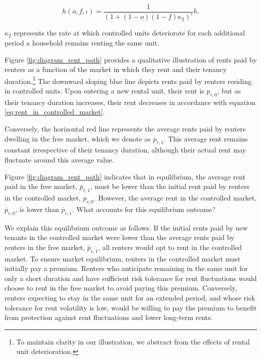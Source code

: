 \documentclass[parskip=full]{article}
\begin{document}
\begin{equation}
    h(o,f,\iota)=\frac{1}{(1+(1-o)(1-f)\kappa_{2})^{\iota}} h.
\end{equation}
 
\noindent $\kappa_{2}$ represents the rate at which controlled units deteriorate for each additional period a household remains renting the same unit.

Figure \ref{fig:diagram_rent_path} provides a qualitative illustration of rents paid by renters as a function of the market in which they rent and their tenancy duration.\footnote{To maintain clarity in our illustration, we abstract from the effects of rental unit deterioration.} The downward sloping blue line depicts rents paid by renters residing in controlled units. Upon entering a new rental unit, their rent is $p_{r,0}$, but as their tenancy duration increases, their rent decreases in accordance with equation \eqref{eq:rent_in_controlled_market}.

Conversely, the horizontal red line represents the average rents paid by renters dwelling in the free market, which we denote as $\overline{p}_{r,1}$. This average rent remains constant irrespective of their tenancy duration, although their actual rent may fluctuate around this average value.

Figure \ref{fig:diagram_rent_path} indicates that in equilibrium, the average rent paid in the free market, $\overline{p}_{r,1}$, must be lower than the initial rent paid by renters in the controlled market, $p_{r,0}$. However, the average rent in the controlled market, $\overline{p}_{r,0}$, is lower than $\overline{p}_{r,1}$. What accounts for this equilibrium outcome?

We explain this equilibrium outcome as follows. If the initial rents paid by new tenants in the controlled market were lower than the average rents paid by renters in the free market, $\overline{p}_{r,1}$, all renters would opt to rent in the controlled market. To ensure market equilibrium, renters in the controlled market must initially pay a premium. Renters who anticipate remaining in the same unit for only a short duration and have sufficient risk tolerance for rent fluctuations would choose to rent in the free market to avoid paying this premium. Conversely, renters expecting to stay in the same unit for an extended period, and whose risk tolerance for rent volatility is low, would be willing to pay the premium to benefit from protection against rent fluctuations and lower long-term rents.
\end{document}
